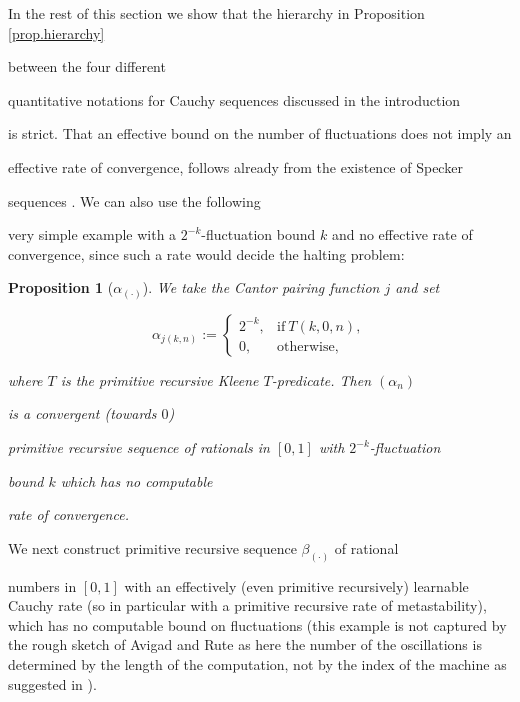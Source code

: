 \documentclass[1p]{elsarticle}
\newcommand{\Tif}{\text{if}\ }
\newcommand{\Telse}{\text{otherwise}}
\theoremstyle{plain}
\newtheorem{prop}[thm]{Proposition}
\theoremstyle{definition}
\theoremstyle{remark}
\theoremstyle{definition}
\begin{document}
{In the rest of this section we show that the hierarchy in Proposition \ref{prop.hierarchy} 

between the four different 

quantitative notations for Cauchy sequences discussed in the introduction 

is strict. That an effective bound on the number of fluctuations does not imply an 

effective rate of convergence, follows already from the existence of Specker 

sequences \cite{Specker(49)}. We can also use the following

very simple example with a $2^{-k}$-fluctuation bound $k$ and no effective rate of convergence, since such a rate would decide the halting problem:\\ 

\begin{prop}[$\alpha_{(\cdot)}$] 

We take the Cantor pairing function $j$ and set

\[

\alpha_{j(k,n)}:=

\begin{cases}

2^{-k}, &\Tif T(k,0,n),\\

0, &\Telse,

\end{cases}

\]

where $T$ is the primitive recursive Kleene $T$-predicate. Then $(\alpha_n)$ 

is a convergent (towards $0$)

primitive recursive sequence of rationals in $[0,1]$ with $2^{-k}$-fluctuation 

bound $k$ which has no computable 

rate of convergence.

\end{prop}

We next construct primitive recursive sequence $\beta_{(\cdot)}$ of rational 

numbers in $[0,1]$ with an effectively (even primitive recursively) learnable Cauchy rate (so in particular with a primitive recursive rate of metastability), which has no computable bound on fluctuations (this example is not captured by the rough sketch of Avigad and Rute as here the number of the oscillations is determined by the length of the computation, not by the index of the machine as suggested in \cite{Avigad/Rute}). 

}
\end{document}
